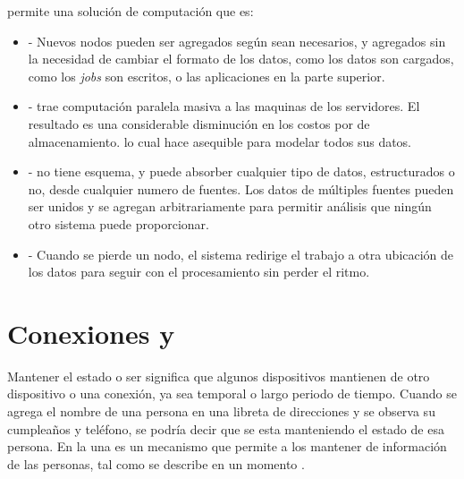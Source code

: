 \hadoopNAME permite una solución de computación que es:

\begin{itemize}
	\item \textbf{\scalableQA}- Nuevos nodos pueden ser agregados según sean necesarios, y agregados sin la necesidad de cambiar el formato de los datos, como los datos son cargados, como los \textit{jobs} son escritos, o las aplicaciones en la parte superior.
	
	\item \textbf{\costEffectiveCPT}- \hadoopNAME trae computación paralela masiva a las maquinas de los servidores. El resultado es una considerable disminución en los costos por \terabytePC de almacenamiento. lo cual hace asequible para modelar todos sus datos.
	
	\item \textbf{\flexibleQA}- \hadoopNAME no tiene esquema, y puede absorber cualquier tipo de datos, estructurados o no, desde cualquier numero de fuentes. Los datos de múltiples fuentes pueden ser unidos y se agregan arbitrariamente para permitir análisis que ningún otro sistema puede proporcionar.
	
	\item \textbf{\faultTolerantQA}- Cuando se pierde un nodo, el sistema redirige el trabajo a otra ubicación de los datos para seguir con el procesamiento sin perder el ritmo.
\end{itemize}

\chapter{Conexiones \stateful y \stateless }\label{ap:apendice_connection_statful_stateless}

Mantener el estado o ser \stateful significa que algunos dispositivos mantienen \trackCPT de otro dispositivo o una conexión, ya sea temporal o largo periodo de tiempo. Cuando se agrega el nombre de una persona en una libreta de direcciones y se observa su cumpleaños y teléfono, se podría decir que se esta manteniendo el estado de esa persona. En la \webINT una \cookieINT es un mecanismo \stateful que permite a los \webserverINT mantener \trackCPT de información de las personas, tal como se describe en un momento \cite{online_connection_stateful_stateless}.


